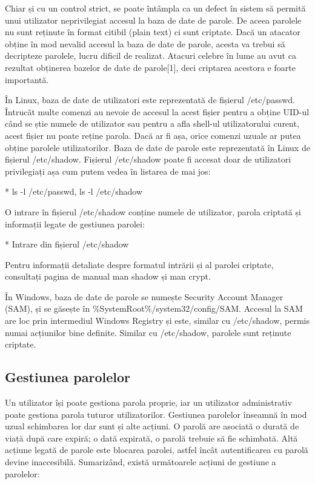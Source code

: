 Chiar și cu un control strict, se poate întâmpla ca un defect în sistem să
permită unui utilizator neprivilegiat accesul la baza de date de parole. De
aceea parolele nu sunt reținute în format citibil (plain text) ci sunt criptate.
Dacă un atacator obține în mod nevalid accesul la baza de date de parole, acesta
va trebui să decripteze parolele, lucru dificil de realizat. Atacuri celebre în
lume au avut ca rezultat obținerea bazelor de date de parole[1], deci criptarea
acestora e foarte importantă.

În Linux, baza de date de utilizatori este reprezentată de fișierul /etc/passwd.
Întrucât multe comenzi au nevoie de accesul la acest fișier pentru a obține
UID-ul când se știe numele de utilizator sau pentru a afla shell-ul
utilizatorului curent, acest fișier nu poate reține parola. Dacă ar fi așa,
orice comenzi uzuale ar putea obține parolele utilizatorilor. Baza de date de
parole este reprezentată în Linux de fișierul /etc/shadow. Fișierul /etc/shadow
poate fi accesat doar de utilizatori privilegiați așa cum putem vedea în
listarea de mai jos:

* ls -l /etc/passwd, ls -l /etc/shadow

O intrare în fișierul /etc/shadow conține numele de utilizator, parola criptată
și informații legate de gestiunea parolei:

* Intrare din fișierul /etc/shadow

Pentru informații detaliate despre formatul intrării și al parolei criptate, consultați pagina de manual man shadow și man crypt.

În Windows, baza de date de parole se numește Security Account Manager (SAM), și
se găsește în \%SystemRoot\%/system32/config/SAM. Accesul la SAM are loc prin
intermediul Windows Registry și este, similar cu /etc/shadow, permis numai
acțiunilor bine definite. Similar cu /etc/shadow, parolele sunt reținute
criptate.

\subsection{Gestiunea parolelor}
\label{sec:users-auth-pass-gestiune}

Un utilizator își poate gestiona parola proprie, iar un utilizator administrativ poate gestiona parola tuturor utilizatorilor. Gestiunea parolelor înseamnă în mod uzual schimbarea lor dar sunt și alte acțiuni. O parolă are asociată o durată de viață după care expiră; o dată expirată, o parolă trebuie să fie schimbată. Altă acțiune legată de parole este blocarea parolei, astfel încât autentificarea cu parolă devine inaccesibilă. Sumarizând, există următoarele acțiuni de gestiune a parolelor:

